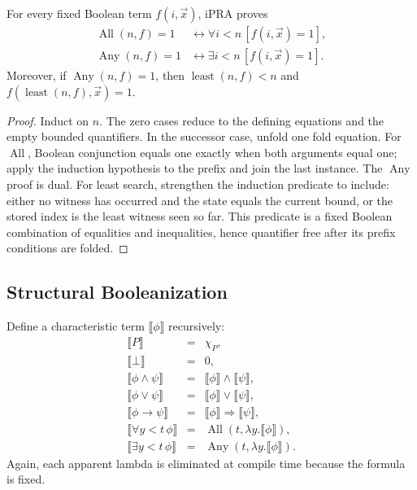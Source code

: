 \begin{lemma}
For every fixed Boolean term \(f(i,\vec x)\), iPRA proves
\begin{align*}
 \operatorname{All}(n,f)=1
 &\leftrightarrow \forall i<n\,[f(i,\vec x)=1],\\
 \operatorname{Any}(n,f)=1
 &\leftrightarrow \exists i<n\,[f(i,\vec x)=1].
\end{align*}
Moreover, if \(\operatorname{Any}(n,f)=1\), then
\(\operatorname{least}(n,f)<n\) and
\(f(\operatorname{least}(n,f),\vec x)=1\).
\end{lemma}

\begin{proof}
Induct on \(n\).  The zero cases reduce to the defining equations and the
empty bounded quantifiers.  In the successor case, unfold one fold equation.
For \(\operatorname{All}\), Boolean conjunction equals one exactly when both
arguments equal one; apply the induction hypothesis to the prefix and join the
last instance.  The \(\operatorname{Any}\) proof is dual.  For least search,
strengthen the induction predicate to include: either no witness has occurred
and the state equals the current bound, or the stored index is the least
witness seen so far.  This predicate is a fixed Boolean combination of
equalities and inequalities, hence quantifier free after its prefix conditions
are folded.
\end{proof}

\subsection{Structural Booleanization}

Define a characteristic term \(\llbracket\phi\rrbracket\) recursively:
\[
\begin{array}{rcl}
\llbracket P\rrbracket &=& \chi_P,\\
\llbracket\bot\rrbracket&=&0,\\
\llbracket\phi\wedge\psi\rrbracket&=&
 \llbracket\phi\rrbracket\wedge\llbracket\psi\rrbracket,\\
\llbracket\phi\vee\psi\rrbracket&=&
 \llbracket\phi\rrbracket\vee\llbracket\psi\rrbracket,\\
\llbracket\phi\to\psi\rrbracket&=&
 \llbracket\phi\rrbracket\Rightarrow\llbracket\psi\rrbracket,\\
\llbracket\forall y<t\,\phi\rrbracket&=&
 \operatorname{All}(t,\lambda y.\llbracket\phi\rrbracket),\\
\llbracket\exists y<t\,\phi\rrbracket&=&
 \operatorname{Any}(t,\lambda y.\llbracket\phi\rrbracket).
\end{array}
\]
Again, each apparent lambda is eliminated at compile time because the formula
is fixed.

